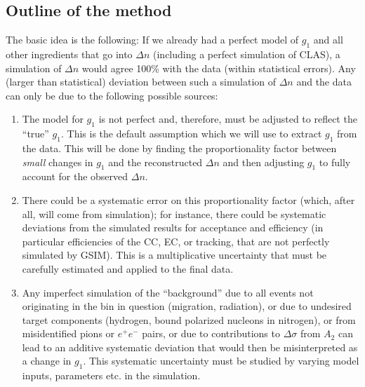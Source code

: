 \subsection{Outline of the method}
\label{scaleerr} %
The basic idea is the following: If we already had a perfect model of $g_1$ and all other ingredients that go into $\Delta n$ (including a perfect simulation of CLAS), a simulation of $\Delta n$ would agree 100\% with the data (within statistical errors). Any (larger than statistical) deviation between such a simulation of $\Delta n$ and the data can only be due to the following possible sources:
\begin{enumerate}
\item The model for $g_1$ is not perfect and, therefore, must be adjusted to reflect the ``true'' $g_1$. This is the default assumption which we will use to extract $g_1$ from the data. This will be done by finding the proportionality factor between {\em small} changes in $g_1$ and the reconstructed $\Delta n$ and then adjusting $g_1$ to fully account for the observed $\Delta n$.
\item There could be a systematic error on this proportionality factor (which, after all, will come from simulation); for instance, there could be systematic deviations from the simulated results for acceptance and efficiency (in particular efficiencies of the CC, EC, or tracking, that are not perfectly simulated by GSIM). This is a multiplicative uncertainty that must be carefully estimated and applied to the final data.
\item Any imperfect simulation of the  ``background'' due to all events not originating in the bin in question (migration, radiation), or due to undesired target components (hydrogen, bound polarized nucleons in nitrogen), or from misidentified pions or $e^+e^-$ pairs, or due to contributions to $\Delta \sigma$ from $A_2$ can lead to an additive systematic deviation that would then be misinterpreted as a change in $g_1$. This systematic uncertainty must be studied by varying model inputs, parameters etc. in the simulation.
\end{enumerate}
